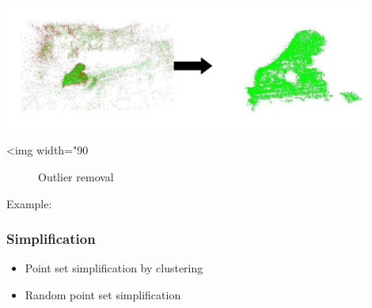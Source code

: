   \\

\begin{center}
    \label{Surface_reconstruction_3-fig-outlier_removal}
    \begin{ccTexOnly}
        \includegraphics[width=0.9\textwidth]{Surface_reconstruction_3/outlier_removal} %
    \end{ccTexOnly}
    \begin{ccHtmlOnly}
        <img width="90%
    \end{ccHtmlOnly}
    \begin{figure}[h]
        \caption{Outlier removal}
    \end{figure}
\end{center}

Example:



\subsubsection{Simplification}

\begin{itemize}
\item Point set simplification by clustering
\item Random point set simplification
\end{itemize}

  \\
  \\

